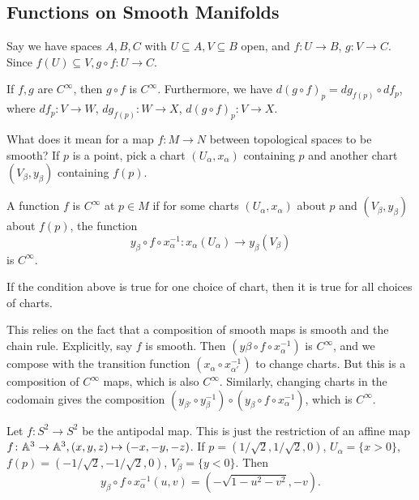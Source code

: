 \subsection{Functions on Smooth Manifolds}
Say we have spaces $A,B,C$ with $U \subseteq A, V \subseteq B$ open, and $f \colon U \to B$, $g \colon V \to C$. Since $f(U) \subseteq V, g \circ f \colon U \to C$.
\begin{theorem}
    If $f,g$ are $C^{\infty}$, then $g \circ f$ is $C^{\infty}$. Furthermore, we have $d( g \circ f) _p = dg _{f(p)}\circ df_p$, where $df_p \colon V \to W$, $dg _{f(p)}\colon W \to X$, $d(g \circ f)_p \colon V \to X$. 
\end{theorem}
What does it mean for a map $f \colon M \to N$ between topological spaces to be smooth? If $p$ is a point, pick a chart $(U_{\alpha }, x_{\alpha })$ containing $p$ and another chart $(V_{\beta }, y _{\beta })$ containing $f(p)$.
\begin{definition}[]
    A function $f$ is $C^{\infty}$ at $p \in M$ if for some charts $(U _{\alpha }, x_{\alpha })$ about $p$ and $(V _{\beta },y _{\beta })$ about $f(p)$, the function \[
        y_{\beta }\circ f \circ x _{\alpha }^{-1} \colon x_{\alpha }(U_{\alpha }) \to y_{\beta }(V_{\beta })
    \] is $C^{\infty}$.
\end{definition}
\begin{lemma}
    If the condition above is true for one choice of chart, then it is true for all choices of charts. 
\end{lemma}
This relies on the fact that a composition of smooth maps is smooth and the chain rule. Explicitly, say $f$ is smooth. Then $(y\beta \circ f \circ x_{\alpha }^{-1})$ is $C^{\infty}$, and we compose with the transition function $(x _{\alpha }\circ x_{\alpha '}^{-1})$ to change charts. But this is a composition of $C^{\infty}$ maps, which is also $C^{\infty}$. Similarly, changing charts in the codomain gives the composition $(y _{\beta' }\circ y _{\beta }^{-1}) \circ (y _{\beta }\circ f \circ x _{\alpha }^{-1})$, which is $C^{\infty}$.
\begin{example}
    Let $f \colon S ^2 \to S ^2$ be the antipodal map. This is just the restriction of an affine map $f \colon \mathbb{A}^3 \to \mathbb{A}^3, (x,y,z)\mapsto (-x,-y,-z)$. If $p=(1 /\sqrt{2} , 1/\sqrt{2} ,0)$, $U_{\alpha }=\{x>0\} $, $f(p)=(-1 /\sqrt{2} , -1 /\sqrt{2} ,0)$, $V_{\beta }=\{y<0\} $. Then \[
        y _{\beta }\circ f \circ x _{\alpha }^{-1} (u,v)= \left( -\sqrt{1-u^2-v^2} , -v \right) .
    \] 
\end{example}


